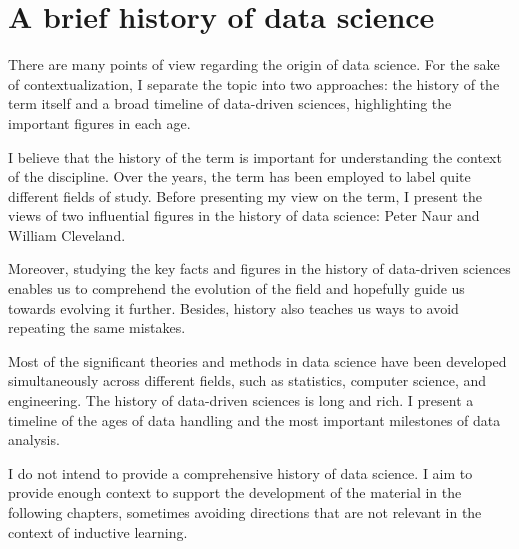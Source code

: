\chapter{A brief history of data science}
\label{chap:history}
\glsresetall


There are many points of view regarding the origin of data science.  For the sake of
contextualization, I separate the topic into two approaches: the history of the term itself
and a broad timeline of data-driven sciences, highlighting the important figures in each
age.

I believe that the history of the term is important for understanding the context of the
discipline. Over the years, the term has been employed to label quite different fields of
study.  Before presenting my view on the term, I present the views of two influential
figures in the history of data science: Peter Naur and William Cleveland.

Moreover, studying the key facts and figures in the history of data-driven sciences
enables us to comprehend the evolution of the field and hopefully guide us towards evolving it
further.  Besides, history also teaches us ways to avoid repeating the same mistakes.

Most of the significant theories and methods in data science have been developed
simultaneously across different fields, such as statistics, computer science, and engineering.
The history of data-driven sciences is long and rich. I present a timeline of the ages of
data handling and the most important milestones of data analysis.

I do not intend to provide a comprehensive history of data science.  I aim to provide
enough context to support the development of the material in the following chapters,
sometimes avoiding directions that are not relevant in the context of inductive learning.


